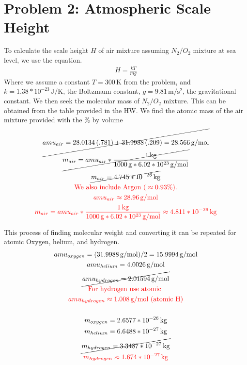\documentclass[11pt]{article}
\begin{document}
\newpage
\section*{Problem 2: Atmospheric Scale Height}
\hspace*{2em}To calculate the scale height $H$ of air mixture assuming $N_2/O_2$ mixture
at sea level, we use the equation.
\[
\begin{gathered}
H = \frac{kT}{mg}
\end{gathered}
\]
\hspace*{2em}Where we assume a constant $T = 300 \, \mathrm{K}$ from the problem, and $k = 1.38*10^{-23} \, \mathrm{J/K}$,
the Boltzmann constant, $g = 9.81 \, \mathrm{m/s^2}$, the gravitational constant. We then
seek the molecular mass of $N_2/O_2$ mixture. This can be obtained from the table provided
in the HW. We find the atomic mass of the air mixture provided with the \% by volume
\[
\begin{gathered}
\cancel{amu_{air} = 28.0134\left(.781\right)+31.9988\left(.209\right) = 28.566\, \mathrm{g/mol}} \\
\cancel{m_{air} = amu_{air}*\frac{1 \, \mathrm{kg}}{1000\, \mathrm{g} * 6.02*10^{23}\, \mathrm{g/mol}}} \\
\cancel{m_{air} = 4.745*10^{-26} \, \mathrm{kg}} \\
\textcolor{red}{\text{We also include Argon (} \approx 0.93\%\text{).}} \\
\textcolor{red}{amu_{air} \approx 28.96 \, \mathrm{g/mol}} \\
\textcolor{red}{m_{air} = amu_{air}*\frac{1 \, \mathrm{kg}}{1000\, \mathrm{g} * 6.02*10^{23}\, \mathrm{g/mol}} \approx 4.811*10^{-26} \, \mathrm{kg}}
\end{gathered}
\]

\hspace*{2em}This process of finding molecular weight and converting it can be repeated for
atomic Oxygen, helium, and hydrogen.
\[
\begin{gathered}
amu_{oxygen} = (31.9988 \, \mathrm{g/mol}) / 2 = 15.9994 \, \mathrm{g/mol} \\
amu_{helium} = 4.0026  \, \mathrm{g/mol} \\
\cancel{amu_{hydrogen} = 2.01594  \, \mathrm{g/mol}}
\\
\textcolor{red}{\text{For hydrogen use atomic }} \\
\textcolor{red}{amu_{hydrogen} \approx 1.008 \, \mathrm{g/mol} \text{ (atomic H)}}
\\
\\
m_{oxygen} = 2.6577*10^{-26} \, \mathrm{kg} \\
m_{helium} = 6.6488*10^{-27} \, \mathrm{kg} \\
\cancel{m_{hydrogen} = 3.3487*10^{-27} \, \mathrm{kg}} \\
\textcolor{red}{m_{hydrogen} \approx 1.674*10^{-27} \, \mathrm{kg}}
\end{gathered}
\]
\end{document}
